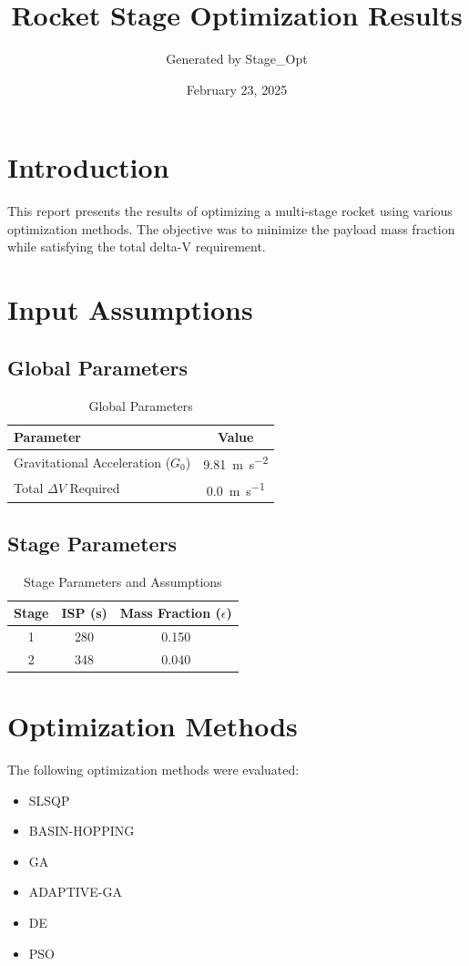 \documentclass{article}
\title{Rocket Stage Optimization Results}
\author{Generated by Stage\_Opt}
\date{February 23, 2025}
\begin{document}
\maketitle

\section{Introduction}
This report presents the results of optimizing a multi-stage rocket using various optimization methods. The objective was to minimize the payload mass fraction while satisfying the total delta-V requirement.

\section{Input Assumptions}
\subsection{Global Parameters}
\begin{table}[H]
\centering
\caption{Global Parameters}
\begin{tabular}{lS[table-format=4.2]}
\toprule
Parameter & {Value} \\
\midrule
Gravitational Acceleration ($G_0$) & \SI{9.81}{\meter\per\second\squared} \\
Total $\Delta V$ Required & \SI{0.0}{\meter\per\second} \\
\bottomrule
\end{tabular}
\end{table}

\subsection{Stage Parameters}
\begin{table}[H]
\centering
\caption{Stage Parameters and Assumptions}
\begin{tabular}{cS[table-format=3.0]S[table-format=1.3]}
\toprule
Stage & {ISP (\si{\second})} & {Mass Fraction ($\epsilon$)} \\
 & 280 & 0.150 \\
2 & 348 & 0.040 \\
\bottomrule
\end{tabular}
\end{table}

\section{Optimization Methods}
The following optimization methods were evaluated:
\begin{itemize}
\item SLSQP
\item BASIN-HOPPING
\item GA
\item ADAPTIVE-GA
\item DE
\item PSO
\end{itemize}
\end{document}

